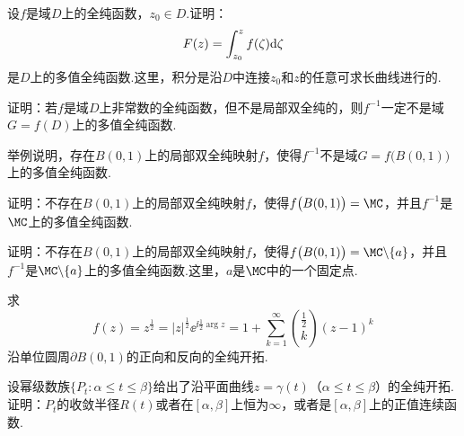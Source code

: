 \begin{xiti}\hypertarget{xiti6.3}{}
\item 设$f$是域$D$上的全纯函数，$z_0\in D$.证明：
\[F(z)=\int_{z_0}^zf(\zeta)\textrm d\zeta\]
是$D$上的多值全纯函数.这里，积分是沿$D$中连接$z_0$和$z$的任意可求长曲线进行的.
\item 证明：若$f$是域$D$上非常数的全纯函数，但不是局部双全纯的，则$f^{-1}$一定不是域$G=f(D)$上的多值全纯函数.
\item \hypertarget{xiti6.3.3}{} 举例说明，存在$B(0,1)$上的局部双全纯映射$f$，使得$f^{-1}$不是域$G=f\big(B(0,1)\big)$上的多值全纯函数.
\item \hypertarget{xiti6.3.4}{} 证明：不存在$B(0,1)$上的局部双全纯映射$f$，使得$f\big(B(0,1)\big)=\MC$，并且$f^{-1}$是$\MC$上的多值全纯函数.
\item 证明：不存在$B(0,1)$上的局部双全纯映射$f$，使得$f\big(B(0,1)\big)=\MC\backslash\{a\}$，并且$f^{-1}$是$\MC\backslash\{a\}$上的多值全纯函数.这里，$a$是$\MC$中的一个固定点.
\item 求
\[f(z)=z^{\frac12}=|z|^{\frac12}\ee^{\ii\frac12\arg z}=1+\sum_{k=1}^\infty
\binom{\frac12}{k}(z-1)^k\]
沿单位圆周$\partial B(0,1)$的正向和反向的全纯开拓.
\item 设幂级数族$\{P_t:\alpha\le t\le\beta\}$给出了沿平面曲线$z=\gamma(t)$（$\alpha\le t\le\beta$）的全纯开拓.证明：$P_t$的收敛半径$R(t)$或者在$[\alpha,\beta]$上恒为$\infty$，或者是$[\alpha,\beta]$上的正值连续函数.
\end{xiti} 